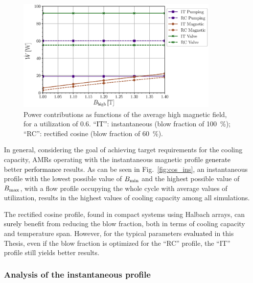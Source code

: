 \documentclass[referee]{svjour3}
\begin{document}
\begin{figure}[!ht]
  \centering
  \includegraphics[width=10cm]{W_B_comp_f_1_Phi_60_same_minimum}
  \caption{Power contributions as functions of the average high magnetic field, for a utilization of 0.6. \textcolor{black}{``IT''}: instantaneous (blow fraction of \SI{100}{\percent}); ``RC'': rectified cosine  (blow fraction of \SI{60}{\percent}).}
  \label{fig:cos_ins_w}
\end{figure}

In general, considering the goal of achieving target requirements for the cooling capacity, AMRs operating with the instantaneous magnetic profile \textcolor{black}{generate} better \textcolor{black}{performance} results. As can be seen \textcolor{black}{in} Fig.~\ref{fig:cos_ins}, an instantaneous profile with the lowest possible value of $B_{\mathrm{min}}$ and the highest possible value of $B_{\mathrm{max}}$, with a flow profile occupying the whole cycle with average values of utilization, results in the highest values of cooling capacity among all simulations. 

The rectified cosine profile, found in compact systems using Halbach arrays, can \textcolor{black}{surely} benefit from reducing the blow fraction, both in terms of cooling capacity and temperature span. However, for the typical parameters \textcolor{black}{evaluated} in this Thesis, even if the blow fraction is optimized for the ``RC'' profile, the ``IT'' profile still yields better results.

\subsubsection{Analysis of the instantaneous profile}
\label{sec:deta-analys-inst}
\end{document}
